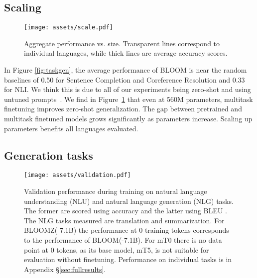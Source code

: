 \documentclass[11pt]{article}
\begin{document}
\subsection{Scaling}
\label{sec:scaling}

\begin{figure}[htbp]
    \centering
    \texttt{[image: assets/scale.pdf]}
    \caption{Aggregate performance vs. size. Transparent lines correspond to individual languages, while thick lines are average accuracy scores.}
    \label{fig:scale}
\end{figure}

In Figure \ref{fig:taskgen}, the average performance of BLOOM is near the random baselines of 0.50 for Sentence Completion and Coreference Resolution and 0.33 for NLI. We think this is due to all of our experiments being zero-shot and using untuned prompts~\cite{perez2021true}. We find in Figure~\ref{fig:scale} that even at 560M parameters, multitask finetuning improves zero-shot generalization. The gap between pretrained and multitask finetuned models grows significantly as parameters increase. Scaling up parameters benefits all languages evaluated.

\subsection{Generation tasks}
\label{sec:generation}

\begin{figure}[htbp]
    \centering
        \texttt{[image: assets/validation.pdf]}
        \caption{Validation performance during training on natural language understanding (NLU) and natural language generation (NLG) tasks. The former are scored using accuracy and the latter using BLEU \cite{papineni2002bleu}. The NLG tasks measured are translation and summarization. For BLOOMZ(-7.1B) the performance at 0 training tokens corresponds to the performance of BLOOM(-7.1B). For mT0 there is no data point at 0 tokens, as its base model, mT5, is not suitable for evaluation without finetuning. Performance on individual tasks is in Appendix \S\ref{sec:fullresults}.}
        \label{fig:validation}
\end{figure}
\end{document}
